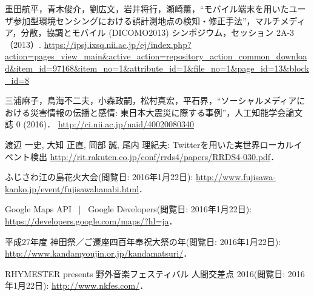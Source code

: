 \begin{thebibliography}{2}

        重田航平，青木俊介，劉広文，岩井将行，瀬崎薫，“モバイル端末を用いたユーザ参加型環境センシングにおける誤計測地点の検知・修正手法”，マルチメディア，分散，協調とモバイル (DICOMO2013) シンポジウム，セッション 2A-3（2013）.
         \url{https://ipsj.ixsq.nii.ac.jp/ej/index.php?action=pages_view_main&active_action=repository_action_common_download&item_id=97168&item_no=1&attribute_id=1&file_no=1&page_id=13&block_id=8}

         三浦麻子，鳥海不二夫，小森政嗣，松村真宏，平石界，“ソーシャルメディアにおける災害情報の伝播と感情: 東日本大震災に際する事例”，人工知能学会論文誌 0 (2016)．
         \url{http://ci.nii.ac.jp/naid/40020080340}

        渡辺 一史, 大知 正直, 岡部 誠, 尾内 理紀夫:
        Twitterを用いた実世界ローカルイベント検出
        \url{http://rit.rakuten.co.jp/conf/rrds4/papers/RRDS4-030.pdf}．

        ふじさわ江の島花火大会(閲覧日: 2016年1月22日):
        \url{http://www.fujisawa-kanko.jp/event/fujisawahanabi.html}．

        Google Maps API  |  Google Developers(閲覧日: 2016年1月22日):
        \url{https://developers.google.com/maps/?hl=ja}．

        平成27年度 神田祭／ご遷座四百年奉祝大祭の年(閲覧日: 2016年1月22日):
        \url{http://www.kandamyoujin.or.jp/kandamatsuri/}．

        RHYMESTER presents 野外音楽フェスティバル 人間交差点 2016(閲覧日: 2016年1月22日):
        \url{http://www.nkfes.com/}．


\end{thebibliography}

